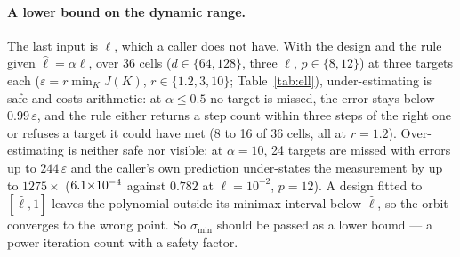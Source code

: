 \paragraph{A lower bound on the dynamic range.}
\label{sec:ellsens}
The last input is $\ell$, which a caller does not have.  With the design and the rule
given $\hat\ell=\alpha\ell$, over 36 cells ($d\in\{64,128\}$,
three $\ell$, $p\in\{8,12\}$) at three targets each
($\varepsilon=r\min_K J(K)$, $r\in\{1.2,3,10\}$; Table~\ref{tab:ell}),
under-estimating is safe and costs arithmetic: at $\alpha\le0.5$ no target is missed, the
error stays below $0.99\,\varepsilon$, and the rule either returns a step count within
three steps of the right one or refuses a target it could have met (8 to 16 of 36 cells,
all at $r=1.2$).  Over-estimating is neither safe nor visible: at $\alpha=10$, 24 targets
are missed with errors up to $244\,\varepsilon$ and the caller's own prediction
under-states the measurement by up to $1275\times$ ($6.1{\times}10^{-4}$ against $0.782$ at
$\ell=10^{-2}$, $p=12$).  A design fitted to $[\hat\ell,1]$ leaves the polynomial
outside its minimax interval below $\hat\ell$, so the orbit converges to the wrong point.
So $\sigma_{\min}$ should be passed as a lower bound --- a power iteration count with a
safety factor.

